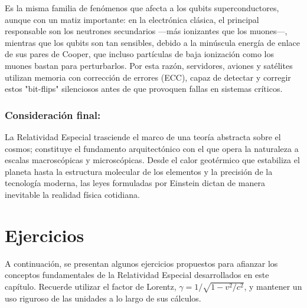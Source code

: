 \documentclass[11pt,a4paper]{book}
\begin{document}
Es la misma familia de fenómenos que afecta a los qubits superconductores, aunque con un matiz
importante: en la electrónica clásica, el principal responsable son los neutrones secundarios
—más ionizantes que los muones—, mientras que los qubits son tan sensibles, debido a la
minúscula energía de enlace de sus pares de Cooper, que incluso partículas de baja ionización
como los muones bastan para perturbarlos. Por esta razón, servidores, aviones y satélites
utilizan memoria con corrección de errores (ECC), capaz de detectar y corregir estos "bit-flips"
silenciosos antes de que provoquen fallas en sistemas críticos.

\subsubsection{Consideración final:} 
La Relatividad Especial trasciende el marco de una teoría abstracta sobre el cosmos; constituye el fundamento arquitectónico con el que opera la naturaleza a escalas macroscópicas y microscópicas. Desde el calor geotérmico que estabiliza el planeta hasta la estructura molecular de los elementos y la precisión de la tecnología moderna, las leyes formuladas por Einstein dictan de manera inevitable la realidad física cotidiana.



\section{Ejercicios}
\label{sec:ejerciciosrelatividad}



A continuación, se presentan algunos ejercicios propuestos para afianzar los conceptos fundamentales de la Relatividad Especial desarrollados en este capítulo. Recuerde utilizar el factor de Lorentz, $\gamma = 1/\sqrt{1 - v^2/c^2}$, y mantener un uso riguroso de las unidades a lo largo de sus cálculos.
\end{document}
